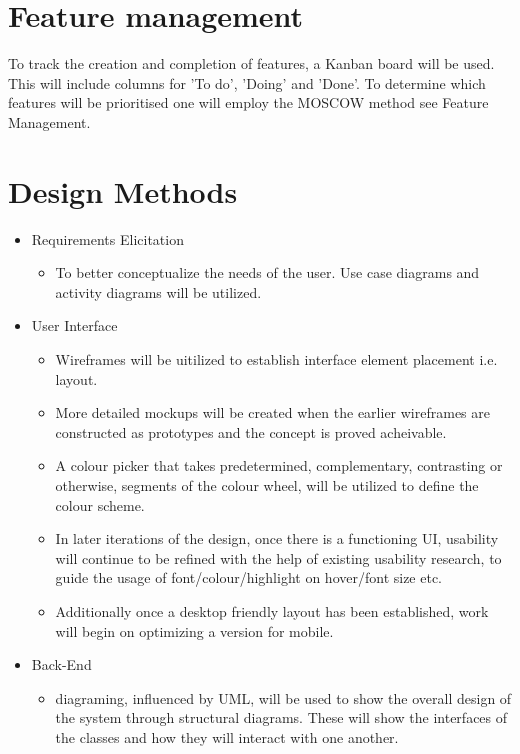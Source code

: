 \section{Feature management}
  To track the creation and completion of features, a Kanban board will be used. This will include columns for 'To do', 'Doing' and 'Done'.
  To determine which features will be prioritised one will employ the MOSCOW method see Feature Management.

\section{Design Methods}
   \begin{itemize}
     \item Requirements Elicitation
     \begin{itemize}
       \item To better conceptualize the needs of the user. Use case diagrams and activity diagrams will be utilized.
     \end{itemize}
     \item User Interface
     \begin{itemize}
       \item Wireframes will be uitilized to establish interface element placement i.e. layout.
       \item More detailed mockups will be created when the earlier wireframes are constructed as prototypes and the concept is proved acheivable.
       \item A colour picker that takes predetermined, complementary, contrasting or otherwise, segments of the colour wheel, will be utilized to define the colour scheme.
       \item In later iterations of the design, once there is a functioning UI,
       usability will continue to be refined with the help of existing usability research,
       to guide the usage of font/colour/highlight on hover/font size etc.
       \item Additionally once a desktop friendly layout has been established, work will begin on optimizing a version for mobile.
     \end{itemize}
     \item Back-End
     \begin{itemize}
       \item diagraming, influenced by UML, will be used to show the overall design of the system through structural diagrams. These will show the interfaces of the classes and how they will interact with one another.
     \end{itemize}
   \end{itemize}

